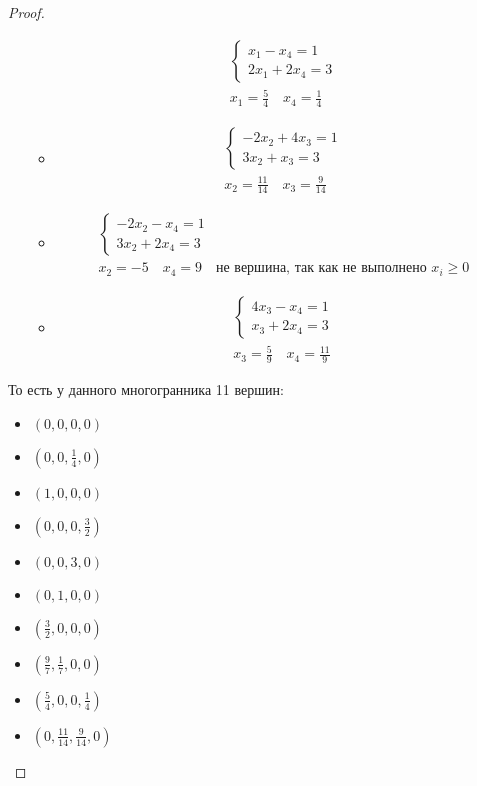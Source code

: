 \begin{proof}
\begin{itemize}
\begin{itemize}
		\begin{gather*}
		\begin{cases}
			x_1 - x_4 = 1\\
			2x_1 + 2x_4 = 3
		\end{cases}\\
		x_1 = \frac{5}{4}\quad
		x_4 = \frac{1}{4}
		\end{gather*}
	\item
		\begin{gather*}
		\begin{cases}
			-2x_2 + 4x_3 = 1\\
			3x_2 + x_3 = 3
		\end{cases}\\
		x_2 = \frac{11}{14}\quad
		x_3 = \frac{9}{14}
		\end{gather*}
	\item
		\begin{gather*}
		\begin{cases}
			-2x_2 - x_4 = 1\\
			3x_2 + 2x_4 = 3
		\end{cases}\\
		x_2 = -5\quad
		x_4 = 9\quad \text{не вершина, так как не выполнено } x_i \geqslant 0
		\end{gather*}
	\item
		\begin{gather*}
		\begin{cases}
			4x_3 - x_4 = 1\\
			x_3 + 2x_4 = 3
		\end{cases}\\
		x_3 = \frac{5}{9}\quad
		x_4 = \frac{11}{9}
		\end{gather*}
	\end{itemize}
	\end{itemize}
	То есть у данного многогранника 11 вершин:
	\begin{itemize}
		\item $(0,0,0,0)$
		\item $(0,0, \frac{1}{4}, 0)$
		\item $(1,0,0,0)$
		\item $(0,0,0,\frac{3}{2})$
		\item $(0,0,3,0)$
		\item $(0,1,0,0)$
		\item $(\frac{3}{2},0,0,0)$
		\item $(\frac{9}{7},\frac{1}{7},0,0)$
		\item $(\frac{5}{4},0,0,\frac{1}{4})$
		\item $(0,\frac{11}{14},\frac{9}{14},0)$

\end{itemize}
\end{proof}

